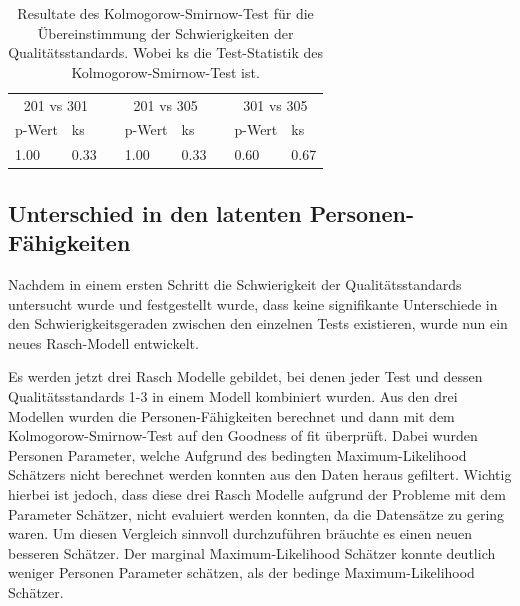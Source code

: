   \begin{table}[htbp]
    \centering
  \begin{tabular}{@{}llllllll@{}}
  \toprule
   \multicolumn{2}{c}{201 vs 301} &&  \multicolumn{2}{c}{201 vs 305}&&  \multicolumn{2}{c}{301 vs 305}\\ 
      \cmidrule{1-2} \cmidrule{4-5} \cmidrule{7-8}   
   p-Wert & ks && p-Wert & ks && p-Wert & ks  \\ 
  \midrule
    1.00 & 0.33 && 1.00 & 0.33 && 0.60 & 0.67  \\ 
  
  \bottomrule
  \end{tabular} 
    \caption{Resultate des Kolmogorow-Smirnow-Test für die Übereinstimmung der Schwierigkeiten der Qualitätsstandards. Wobei ks die Test-Statistik des Kolmogorow-Smirnow-Test ist.}
    \label{tab:corTestQ}
  \end{table}
  
  
  
\subsection{Unterschied in den latenten Personen-Fähigkeiten}

Nachdem in einem ersten Schritt die Schwierigkeit der Qualitätsstandards untersucht wurde und festgestellt wurde, dass keine signifikante Unterschiede in den Schwierigkeitsgeraden zwischen den einzelnen Tests existieren, wurde nun ein neues Rasch-Modell entwickelt.

Es werden jetzt drei Rasch Modelle gebildet, bei denen jeder Test und dessen Qualitätsstandards 1-3 in einem Modell kombiniert wurden. Aus den drei Modellen wurden die Personen-Fähigkeiten berechnet und dann mit dem Kolmogorow-Smirnow-Test auf den Goodness of fit überprüft. Dabei wurden Personen Parameter, welche Aufgrund des bedingten Maximum-Likelihood Schätzers nicht berechnet werden konnten aus den Daten heraus gefiltert. Wichtig hierbei ist jedoch, dass diese drei Rasch Modelle aufgrund der Probleme mit dem Parameter Schätzer, nicht evaluiert werden konnten, da die Datensätze zu gering waren. Um diesen Vergleich sinnvoll durchzuführen bräuchte es einen neuen besseren Schätzer. Der marginal Maximum-Likelihood Schätzer konnte deutlich weniger Personen Parameter schätzen, als der bedinge Maximum-Likelihood Schätzer. 


